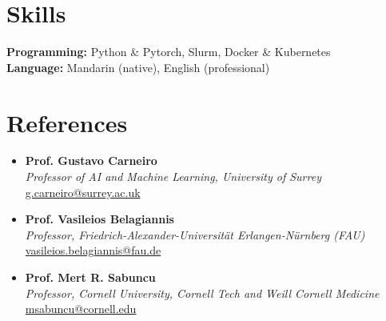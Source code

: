 \documentclass[letterpaper,11pt]{article}
\newcommand{\resumePubheading}[3]{
  \vspace{-2pt} \item\small{
    {\textbf{#1} \vspace{-2pt}}\\
    {\textit{\small#2}}\\ 
    \underline{\small#3}
  }
}
\newcommand{\resumeSubHeadingListStart}{\begin{itemize}[leftmargin=0.15in, label={}]}
\newcommand{\resumeSubHeadingListEnd}{\end{itemize}}
\begin{document}
  \section{Skills}
  \vspace{2pt}
  \resumeSubHeadingListStart
    \small{\item{
        \textbf{Programming: }{Python \& Pytorch, Slurm, Docker \& Kubernetes} \\ \vspace{3pt}
        \textbf{Language: }{Mandarin (native), English (professional)}
        
    }}
  \resumeSubHeadingListEnd

  \section*{References}
  \vspace*{2pt}
  \resumeSubHeadingListStart
  \resumePubheading{Prof. Gustavo Carneiro}{Professor of AI and Machine Learning, University of Surrey}{g.carneiro@surrey.ac.uk}
  \resumePubheading{Prof. Vasileios Belagiannis}{Professor, Friedrich-Alexander-Universität Erlangen-Nürnberg (FAU)}{vasileios.belagiannis@fau.de}
  \resumePubheading{Prof. Mert R. Sabuncu}{Professor, Cornell University, Cornell Tech and Weill Cornell Medicine}{msabuncu@cornell.edu}
\resumeSubHeadingListEnd


\end{document}
